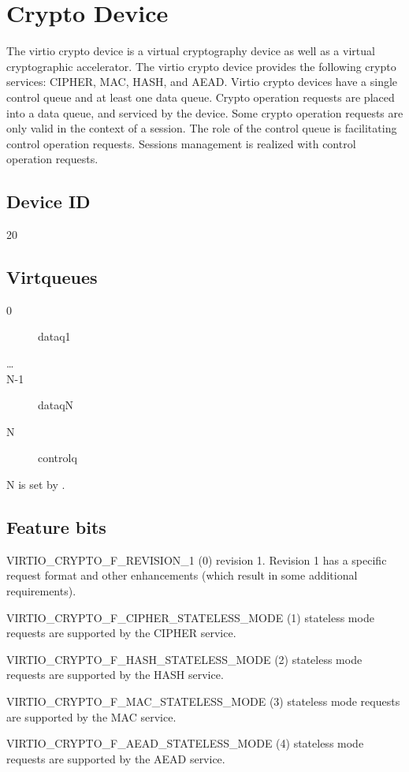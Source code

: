 \section{Crypto Device}\label{sec:Device Types / Crypto Device}

The virtio crypto device is a virtual cryptography device as well as a
virtual cryptographic accelerator. The virtio crypto device provides the
following crypto services: CIPHER, MAC, HASH, and AEAD. Virtio crypto
devices have a single control queue and at least one data queue. Crypto
operation requests are placed into a data queue, and serviced by the
device. Some crypto operation requests are only valid in the context of a
session. The role of the control queue is facilitating control operation
requests. Sessions management is realized with control operation
requests.

\subsection{Device ID}\label{sec:Device Types / Crypto Device / Device ID}

20

\subsection{Virtqueues}\label{sec:Device Types / Crypto Device / Virtqueues}

\begin{description}
\item[0] dataq1
\item[\ldots]
\item[N-1] dataqN
\item[N] controlq
\end{description}

N is set by .

\subsection{Feature bits}\label{sec:Device Types / Crypto Device / Feature bits}

\begin{description}
\item VIRTIO_CRYPTO_F_REVISION_1 (0) revision 1. Revision 1 has a specific
    request format and other enhancements (which result in some additional
    requirements).
\item VIRTIO_CRYPTO_F_CIPHER_STATELESS_MODE (1) stateless mode requests are
    supported by the CIPHER service.
\item VIRTIO_CRYPTO_F_HASH_STATELESS_MODE (2) stateless mode requests are
    supported by the HASH service.
\item VIRTIO_CRYPTO_F_MAC_STATELESS_MODE (3) stateless mode requests are
    supported by the MAC service.
\item VIRTIO_CRYPTO_F_AEAD_STATELESS_MODE (4) stateless mode requests are
    supported by the AEAD service.
\end{description}


